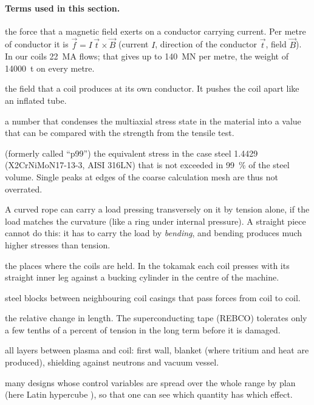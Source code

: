 \paragraph{Terms used in this section.}
\begin{description}\itemsep2pt
\item[Lorentz force] the force that a magnetic field exerts on a conductor carrying current. Per metre of conductor it
  is $\vec f = I\,\vec t\times\vec B$ (current $I$, direction of the conductor $\vec t$, field $\vec B$). In our coils
  \SI{22}{MA} flows; that gives up to \SI{140}{MN} per metre, the weight of \SI{14000}{t} on every metre.
\item[self-field] the field that a coil produces at its own conductor. It pushes the coil apart like an inflated tube.
\item[equivalent stress (von Mises)] a number that condenses the multiaxial stress state in the material into a value
  that can be compared with the strength from the tensile test.
\item[99-\% stress $\sigma_{99}$] (formerly called ``p99'') the equivalent stress in the case steel 1.4429 (X2CrNiMoN17-13-3, AISI 316LN) that is not exceeded in 99~\% of the steel volume. Single peaks at edges of the
  coarse calculation mesh are thus not overrated.
\item[rope tension] A curved rope can carry a load pressing transversely on it by tension alone, if the load matches
  the curvature (like a ring under internal pressure). A straight piece cannot do this: it has to carry the load by
  \emph{bending}, and bending produces much higher stresses than tension.
\item[bearing, bucking cylinder] the places where the coils are held. In the tokamak each coil presses with its
  straight inner leg against a bucking cylinder in the centre of the machine.
\item[connector] steel blocks between neighbouring coil casings that pass forces from coil to coil.
\item[strain] the relative change in length. The superconducting tape (REBCO) tolerates only a few tenths of a percent
  of tension in the long term before it is damaged.
\item[package] all layers between plasma and coil: first wall, blanket (where tritium and heat are produced), shielding
  against neutrons and vacuum vessel.
\item[design study (DOE)] many designs whose control variables are spread over the whole range by plan (here Latin
  hypercube \cite{mckay1979}), so that one can see which quantity has which effect.
\end{description}

